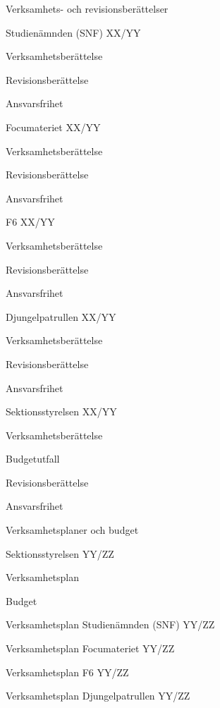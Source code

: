 \documentclass{sektionsmote}
\begin{document}
\begin{ootd}
\item{Verksamhets- och revisionsberättelser}
\begin{ootd}
    \item Studienämnden (SNF) XX/YY
    \begin{ootd}
        \item Verksamhetsberättelse
        \item Revisionsberättelse
        \item Ansvarsfrihet
    \end{ootd}
    \item Focumateriet XX/YY
    \begin{ootd}
        \item Verksamhetsberättelse
        \item Revisionsberättelse
        \item Ansvarsfrihet
    \end{ootd}
    \item F6 XX/YY
    \begin{ootd}
        \item Verksamhetsberättelse
        \item Revisionsberättelse
        \item Ansvarsfrihet
    \end{ootd}
    \item Djungelpatrullen XX/YY
    \begin{ootd}
        \item Verksamhetsberättelse
        \item Revisionsberättelse
        \item Ansvarsfrihet
    \end{ootd}
    \item Sektionsstyrelsen XX/YY
    \begin{ootd}
        \item Verksamhetsberättelse
        \item Budgetutfall
        \item Revisionsberättelse
        \item Ansvarsfrihet
    \end{ootd}
\end{ootd}

\item{Verksamhetsplaner och budget}
\begin{ootd}
    \item Sektionsstyrelsen YY/ZZ
    \begin{ootd}
        \item Verksamhetsplan
        \item Budget
    \end{ootd}
    \item Verksamhetsplan Studienämnden (SNF) YY/ZZ
    \item Verksamhetsplan Focumateriet YY/ZZ
    \item Verksamhetsplan F6 YY/ZZ
    \item Verksamhetsplan Djungelpatrullen YY/ZZ
\end{ootd}


\end{ootd}
\end{document}
